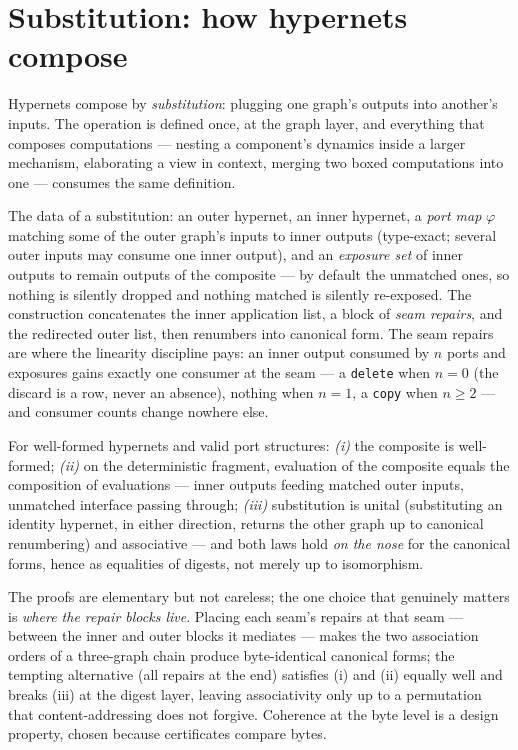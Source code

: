 \section{Substitution: how hypernets compose}
\label{sec:hyp-subst}

Hypernets compose by \emph{substitution}: plugging one graph's
outputs into another's inputs. The operation is defined once, at the
graph layer, and everything that composes computations --- nesting a
component's dynamics inside a larger mechanism, elaborating a view in
context, merging two boxed computations into one --- consumes the
same definition.

The data of a substitution: an outer hypernet, an inner hypernet, a
\emph{port map} $\varphi$ matching some of the outer graph's inputs
to inner outputs (type-exact; several outer inputs may consume one
inner output), and an \emph{exposure set} of inner outputs to remain
outputs of the composite --- by default the unmatched ones, so
nothing is silently dropped and nothing matched is silently
re-exposed. The construction concatenates the inner application
list, a block of \emph{seam repairs}, and the redirected outer list,
then renumbers into canonical form. The seam repairs are where the
linearity discipline pays: an inner output consumed by $n$ ports and
exposures gains exactly one consumer at the seam --- a
\texttt{delete} when $n = 0$ (the discard is a row, never an
absence), nothing when $n = 1$, a \texttt{copy} when $n \ge 2$ ---
and consumer counts change nowhere else.

\begin{theorem}
\label{thm:substitution}
For well-formed hypernets and valid port structures:
\emph{(i)} the composite is well-formed;
\emph{(ii)} on the deterministic fragment, evaluation of the
composite equals the composition of evaluations --- inner outputs
feeding matched outer inputs, unmatched interface passing through;
\emph{(iii)} substitution is unital (substituting an identity
hypernet, in either direction, returns the other graph up to
canonical renumbering) and associative --- and both laws hold
\emph{on the nose} for the canonical forms, hence as equalities of
digests, not merely up to isomorphism.
\end{theorem}

The proofs are elementary but not careless; the one choice that
genuinely matters is \emph{where the repair blocks live}. Placing
each seam's repairs at that seam --- between the inner and outer
blocks it mediates --- makes the two association orders of a
three-graph chain produce byte-identical canonical forms; the
tempting alternative (all repairs at the end) satisfies (i) and (ii)
equally well and breaks (iii) at the digest layer, leaving
associativity only up to a permutation that content-addressing does
not forgive. Coherence at the byte level is a design property, chosen
because certificates compare bytes.

